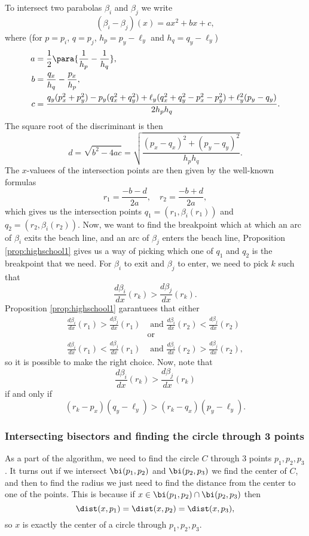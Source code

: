 To intersect two parabolas $\beta_i$ and $\beta_j$ we write
\[
    (\beta_i - \beta_j)(x) = a x^2 + b x + c,
\]
where (for $p = p_i$, $q = p_j$, $h_p = p_y - \ell_y$ and $h_q = q_y - \ell_y$)
\begin{align*}
    a &= \frac{1}{2} \para{\frac{1}{h_p} - \frac{1}{h_q}}, \\
    b &= \frac{q_x}{h_q} - \frac{p_x}{h_p}, \\
    c &= \frac{q_y(p_x^2 + p_y^2) - p_y (q_x^2 + q_y^2) + \ell_y (q_x^2 + q_y^2 - p_x^2 - p_y^2) + \ell_y^2 (p_y - q_y)}{2 h_p h_q}.
\end{align*}
The square root of the discriminant is then
\[
    d = \sqrt{b^2 - 4 ac} = \sqrt{\frac{(p_x - q_x)^2 + (p_y - q_y)^2}{h_p h_q}}.
\]
The $x$-valuees of the intersection points are then given by the well-known formulas
\[
    r_1 = \frac{-b - d}{2 a}, \quad
    r_2 = \frac{-b + d}{2 a},
\]
which gives us the intersection points $q_1 = (r_1, \beta_i(r_1))$ and $q_2 = (r_2, \beta_i(r_2))$. Now, we want to find the breakpoint which at which an arc of $\beta_i$ exits the beach line, and an arc of $\beta_j$ enters the beach line, Proposition \ref{prop:highschool1} gives us a way of picking which one of $q_1$ and $q_2$ is the breakpoint that we need. For $\beta_i$ to exit and $\beta_j$ to enter, we need to pick $k$ such that
\[
    \frac{d \beta_i}{dx}(r_k) > \frac{d \beta_j}{dx}(r_k).
\]
Proposition \ref{prop:highschool1} garantuees that either
\begin{align*}
    \frac{d \beta_i}{dx}(r_1) > \frac{d \beta_j}{dx}(r_1) &\text{ and } \frac{d \beta_i}{dx}(r_2) < \frac{d \beta_j}{dx}(r_2) \\
    &\text{or} \\
    \frac{d \beta_i}{dx}(r_1) < \frac{d \beta_j}{dx}(r_1) &\text{ and } \frac{d \beta_i}{dx}(r_2) > \frac{d \beta_j}{dx}(r_2),
\end{align*}
so it is possible to make the right choice. Now, note that
\[
    \frac{d \beta_i}{dx}(r_k) > \frac{d \beta_j}{dx}(r_k)
\]
if and only if
\[
    (r_k - p_x) (q_y - \ell_y) > (r_k - q_x) (p_y - \ell_y).
\]

\newpage
\subsubsection*{Intersecting bisectors and finding the circle through 3 points}
As a part of the algorithm, we need to find the circle $C$ through 3 points $p_1, p_2, p_3$. It turns out if we intersect $\bi(p_1, p_2)$ and $\bi(p_2, p_3)$ we find the center of $C$, and then to find the radius we just need to find the distance from the center to one of the points. This is because if $x \in \bi(p_1, p_2) \cap \bi(p_2, p_3)$ then
\[
    \dist(x, p_1) = \dist(x, p_2) = \dist(x, p_3),
\]
so $x$ is exactly the center of a circle through $p_1, p_2, p_3$.

